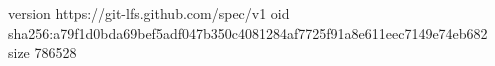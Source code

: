version https://git-lfs.github.com/spec/v1
oid sha256:a79f1d0bda69bef5adf047b350c4081284af7725f91a8e611eec7149e74eb682
size 786528
